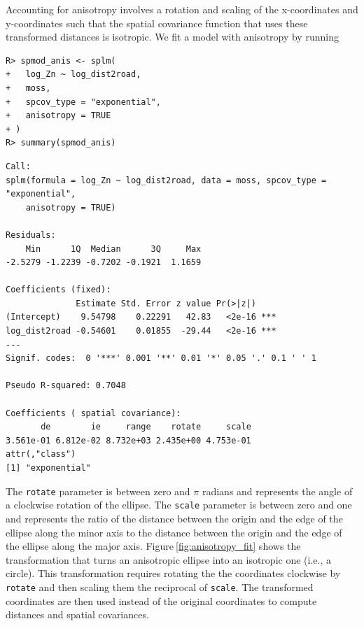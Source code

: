 \documentclass{article}
\begin{document}
Accounting for anisotropy involves a rotation and scaling of the
x-coordinates and y-coordinates such that the spatial covariance
function that uses these transformed distances is isotropic. We fit a
model with anisotropy by running

\begin{verbatim}
R> spmod_anis <- splm(
+   log_Zn ~ log_dist2road,
+   moss,
+   spcov_type = "exponential",
+   anisotropy = TRUE
+ )
R> summary(spmod_anis)
\end{verbatim}

\begin{verbatim}
Call:
splm(formula = log_Zn ~ log_dist2road, data = moss, spcov_type = "exponential", 
    anisotropy = TRUE)

Residuals:
    Min      1Q  Median      3Q     Max 
-2.5279 -1.2239 -0.7202 -0.1921  1.1659 

Coefficients (fixed):
              Estimate Std. Error z value Pr(>|z|)    
(Intercept)    9.54798    0.22291   42.83   <2e-16 ***
log_dist2road -0.54601    0.01855  -29.44   <2e-16 ***
---
Signif. codes:  0 '***' 0.001 '**' 0.01 '*' 0.05 '.' 0.1 ' ' 1

Pseudo R-squared: 0.7048

Coefficients ( spatial covariance):
       de        ie     range    rotate     scale 
3.561e-01 6.812e-02 8.732e+03 2.435e+00 4.753e-01 
attr(,"class")
[1] "exponential"
\end{verbatim}

The \texttt{rotate} parameter is between zero and \(\pi\) radians and
represents the angle of a clockwise rotation of the ellipse. The
\texttt{scale} parameter is between zero and one and represents the
ratio of the distance between the origin and the edge of the ellipse
along the minor axis to the distance between the origin and the edge of
the ellipse along the major axis. Figure\(~\)\ref{fig:anisotropy_fit}
shows the transformation that turns an anisotropic ellipse into an
isotropic one (i.e., a circle). This transformation requires rotating
the the coordinates clockwise by \texttt{rotate} and then scaling them
the reciprocal of \texttt{scale}. The transformed coordinates are then
used instead of the original coordinates to compute distances and
spatial covariances.
\end{document}
